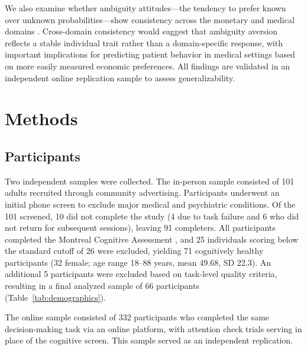 \documentclass[12pt]{article}
\begin{document}
We also examine whether ambiguity attitudes---the tendency to prefer known over unknown probabilities---show consistency across the monetary and medical domains \citep{hsu2005neural}. Cross-domain consistency would suggest that ambiguity aversion reflects a stable individual trait rather than a domain-specific response, with important implications for predicting patient behavior in medical settings based on more easily measured economic preferences. All findings are validated in an independent online replication sample to assess generalizability.

\section{Methods}

\subsection{Participants}

Two independent samples were collected. The in-person sample consisted of 101 adults recruited through community advertising. Participants underwent an initial phone screen to exclude major medical and psychiatric conditions. Of the 101 screened, 10 did not complete the study (4 due to task failure and 6 who did not return for subsequent sessions), leaving 91 completers. All participants completed the Montreal Cognitive Assessment \citep[MoCA;][]{nasreddine2005montreal}, and 25 individuals scoring below the standard cutoff of 26 were excluded, yielding 71 cognitively healthy participants (32 female; age range 18--88 years, mean 49.68, SD 22.3). An additional 5 participants were excluded based on task-level quality criteria, resulting in a final analyzed sample of 66 participants (Table~\ref{tab:demographics}).

The online sample consisted of 332 participants who completed the same decision-making task via an online platform, with attention check trials serving in place of the cognitive screen. This sample served as an independent replication.
\end{document}
